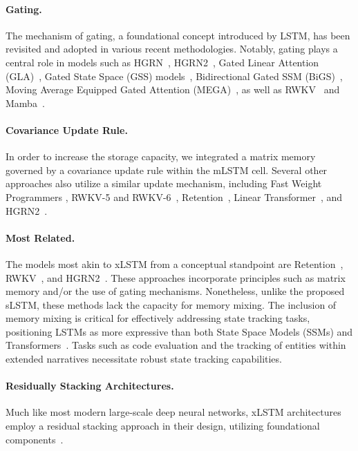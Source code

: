 \paragraph{Gating.}
The mechanism of gating, a foundational concept introduced by LSTM, has been revisited and adopted in various recent methodologies. Notably, gating plays a central role in models such as HGRN~\citep{Qin:23}, HGRN2~\citep{Qin:24arxiv}, Gated Linear Attention (GLA)~\citep{Yang:23arxiv}, Gated State Space (GSS) models~\citep{Mehta:22}, Bidirectional Gated SSM (BiGS)~\citep{Wang:22}, Moving Average Equipped Gated Attention (MEGA)~\citep{Ma:22}, as well as RWKV~\citep{Peng:23arxivshort} and Mamba~\citep{Gu:24arxiv}.

\paragraph{Covariance Update Rule.} In order to increase the storage capacity, we integrated a matrix memory governed by a covariance update rule within the mLSTM cell. Several other approaches also utilize a similar update mechanism, including Fast Weight Programmers \citep{Schmidhuber:92ncfastweights,Schlag:21}, RWKV-5 and RWKV-6~\citep{Peng:24arxivshort}, Retention~\citep{Sun:23arxiv}, Linear Transformer~\citep{Katharopoulos:20}, and HGRN2~\citep{Qin:24arxiv}.

\paragraph{Most Related.} The models most akin to xLSTM from a conceptual standpoint are Retention~\citep{Sun:23arxiv}, RWKV~\citep{Peng:23arxivshort,Peng:24arxivshort}, and HGRN2~\citep{Qin:24arxiv}. These approaches incorporate principles such as matrix memory and/or the use of gating mechanisms. Nonetheless, unlike the proposed sLSTM, these methods lack the capacity for memory mixing. The inclusion of memory mixing is critical for effectively addressing state tracking tasks, positioning LSTMs as more expressive than both State Space Models (SSMs) and Transformers~\citep{Merrill:24,Deletang:23}. Tasks such as code evaluation and the tracking of entities within extended narratives necessitate robust state tracking capabilities.

\paragraph{Residually Stacking Architectures.} Much like most modern large-scale deep neural networks, xLSTM architectures employ a residual stacking approach in their design, utilizing foundational components~\citep{Srivastava:15,He:16}.

